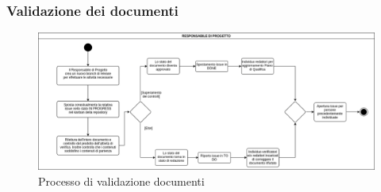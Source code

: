 \subsubsection{Validazione dei documenti}
\begin{figure}[h!]
    \includegraphics[width=\linewidth]{res/images/processo_validazione.png}
    \caption{Processo di validazione documenti}
\end{figure}







